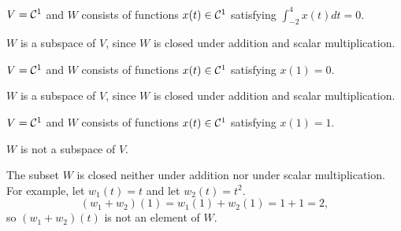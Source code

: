 \documentclass{ximera}
\begin{document}
\begin{exercise} \label{c5.1.4g}
$V={\cal C}^1$ and $W$ consists of functions
     $x(t)\in{\cal C}^1$ satisfying $\int_{-2}^4x(t)dt =0$.

\begin{solution}
$W$ is a subspace of $V$, since $W$ is closed under
addition and scalar multiplication.

\end{solution}
\end{exercise}
\begin{exercise} \label{c5.1.4e}
$V={\cal C}^1$ and $W$ consists of functions
     $x(t)\in{\cal C}^1$ satisfying $x(1)=0$.

\begin{solution}
$W$ is a subspace of $V$, since $W$ is closed under
addition and scalar multiplication.

\end{solution}
\end{exercise}
\begin{exercise} \label{c5.1.4f}
$V={\cal C}^1$ and $W$ consists of functions
     $x(t)\in{\cal C}^1$ satisfying $x(1)=1$.

\begin{solution}
\ans $W$ is not a subspace of $V$.

\soln The subset $W$ is closed neither under addition nor under scalar
multiplication.  For example, let $w_1(t) = t$ and let $w_2(t) = t^2$.
\[
(w_1 + w_2)(1) = w_1(1) + w_2(1) = 1 + 1 = 2,
\]
so $(w_1 + w_2)(t)$ is not an element of $W$.


\end{solution}
\end{exercise}
\end{document}
